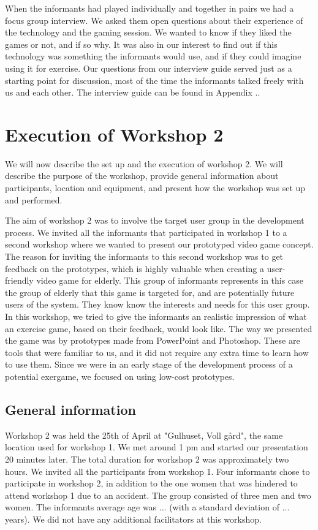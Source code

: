 When the informants had played individually and together in pairs we had a focus group interview. We asked them open questions about their experience of the technology and the gaming session. We wanted to know if they liked the games or not, and if so why. It was also in our interest to find out if this technology was something the informants would use, and if they could imagine using it for exercise. Our questions from our interview guide served just as a starting point for discussion, most of the time the informants talked freely with us and each other. The interview guide can be found in Appendix ..                 


\section{Execution of Workshop 2}
\label{sec:ws2}
We will now describe the set up and the execution of workshop 2. We will describe the purpose of the workshop, provide general information about participants, location and equipment, and present how the workshop was set up and performed. 

The aim of workshop 2 was to involve the target user group in the development process. We invited all the informants that participated in workshop 1 to a second workshop where we wanted to present our prototyped video game concept. The reason for inviting the informants to this second workshop was to get feedback on the prototypes, which is highly valuable when creating a user-friendly video game for elderly. This group of informants represents in this case the group of elderly that this game is targeted for, and are potentially future users of the system. They know know the interests and needs for this user group. In this workshop, we tried to give the informants an realistic impression of what an exercise game, based on their feedback, would look like. The way we presented the game was by prototypes made from PowerPoint and Photoshop. These are tools that were familiar to us, and it did not require any extra time to learn how to use them. Since we were in an early stage of the development process of a potential exergame, we focused on using low-cost prototypes.  

\subsection{General information}
Workshop 2 was held the 25th of April at "Gulhuset, Voll gård", the same location used for workshop 1. We met around 1 pm and started our presentation 20 minutes later. The total duration for workshop 2 was approximately two hours. We invited all the participants from workshop 1. Four informants chose to participate in workshop 2, in addition to the one women that was hindered to attend workshop 1 due to an accident. The group consisted of three men and two women. The informants average age was ... (with a standard deviation of ... years). We did not have any additional facilitators at this workshop. 

